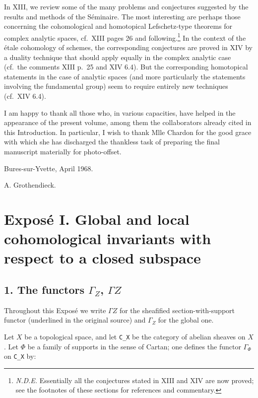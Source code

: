 \documentclass[
  11pt,
  a4paper,
]{book}
\begin{document}
In XIII, we review some of the many problems and conjectures suggested
by the results and methods of the Séminaire. The most interesting are
perhaps those concerning the cohomological and homotopical
Lefschetz-type theorems for complex analytic spaces, cf.~XIII pages 26
and following.\footnote{\emph{N.D.E.} Essentially all the conjectures
  stated in XIII and XIV are now proved; see the footnotes of these
  sections for references and commentary.} In the context of the étale
cohomology of schemes, the corresponding conjectures are proved in XIV
by a duality technique that should apply equally in the complex analytic
case (cf.~the comments XIII p.~25 and XIV 6.4). But the corresponding
homotopical statements in the case of analytic spaces (and more
particularly the statements involving the fundamental group) seem to
require entirely new techniques (cf.~XIV 6.4).

I am happy to thank all those who, in various capacities, have helped in
the appearance of the present volume, among them the collaborators
already cited in this Introduction. In particular, I wish to thank Mlle
Chardon for the good grace with which she has discharged the thankless
task of preparing the final manuscript materially for photo-offset.

Bures-sur-Yvette, April 1968.

A. Grothendieck.

\chapter{Exposé I. Global and local cohomological invariants with
respect to a closed
subspace}\label{exposuxe9-i.-global-and-local-cohomological-invariants-with-respect-to-a-closed-subspace}

\section{\texorpdfstring{1. The functors \(\Gamma_{Z}\),
\(\Gamma Z\)}{1. The functors \textbackslash Gamma\_\{Z\}, \textbackslash Gamma Z}}\label{the-functors-gamma_z-gamma-z}

Throughout this Exposé we write \(\Gamma Z\) for the sheafified
section-with-support functor (underlined in the original source) and
\(\Gamma_{Z}\) for the global one.

Let \(X\) be a topological space, and let \texttt{C\_X} be the category
of abelian sheaves on \(X\). Let \(\Phi\) be a family of supports in the
sense of Cartan; one defines the functor \(\Gamma_{\Phi}\) on
\texttt{C\_X} by:
\end{document}
